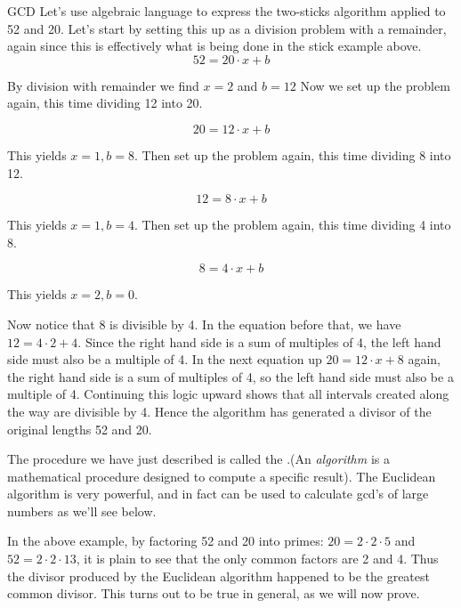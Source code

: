 \begin{example}{GCD}
Let's use algebraic language to express the two-sticks algorithm applied to 52 and 20.
Let's start by setting this up as a division problem with a remainder, again since this is effectively what is being done in the stick example above.
\[ 52 = 20\cdot x + b\]

By division with remainder we find $x=2$ and $b=12$
Now we set up the problem again, this time dividing 12 into 20. 

\[ 20 = 12\cdot x + b\]

This yields $x=1, b=8$.  Then set up the problem again, this time dividing 8 into 12.

\[ 12 = 8\cdot x + b\]

This yields $x=1, b=4$.  Then set up the problem again, this time dividing 4 into 8.

\[ 8 = 4\cdot x + b\]

This yields $x=2, b=0$.  

Now notice that 8 is divisible by 4.  In the equation before that, we have $12 = 4\cdot2 + 4$.  Since the right hand side is a sum of multiples of 4, the left hand side must also be a multiple of 4.  In the next equation up $20=12\cdot x + 8$ again, the right hand side is a sum of multiples of 4, so the left hand side must also be a multiple of 4.  Continuing this logic upward shows that all intervals created along the way are divisible by 4.  Hence the algorithm has generated a divisor of the original lengths 52 and 20.  

The procedure we have just described is called the .(An \emph{algorithm} is a mathematical procedure designed to compute a specific result). The Euclidean algorithm is very powerful, and in fact can be used to calculate gcd's of large numbers as we'll see below.

 In the above example,  by factoring 52 and 20 into primes: $20=2\cdot2\cdot5$ and $52=2\cdot2\cdot13$, it is plain to see that the only common factors are 2 and 4.  Thus the divisor produced by the Euclidean algorithm happened to be the greatest common divisor. This turns out to be true in general, as we will now prove.

\end{example}

